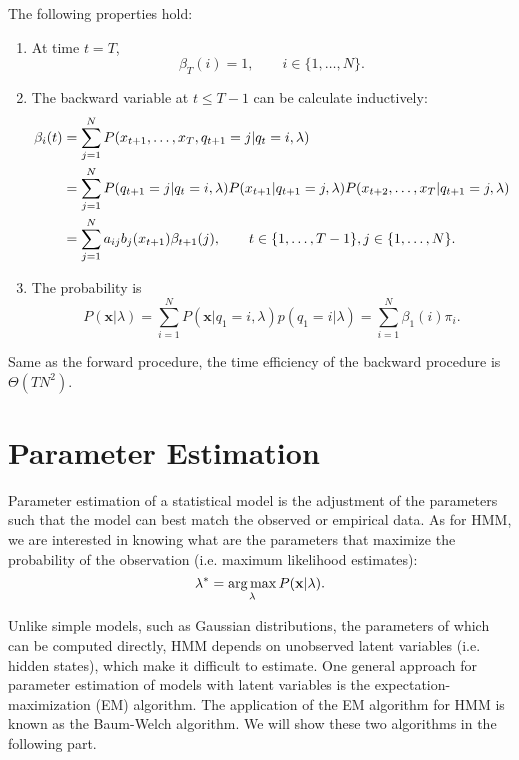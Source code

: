 \documentclass[12pt,final,twoside]{report}
\begin{document}
The following properties hold:
\begin{enumerate}
  \item At time $t = T$,
    \begin{equation}
      \beta_T(i) = 1, \qquad i \in \{1,\dots,N\} .
    \end{equation}
  \item The backward variable at $t \leq T - 1$ can be calculate inductively:
    \begin{align}
      \beta_i(t) &= \sum_{j=1}^{N} P(x_{t+1},\dots,x_T,q_{t+1}=j|q_t=i,\lambda) \notag\\
      &= \sum_{j=1}^{N} P(q_{t+1}=j|q_t=i,\lambda) P(x_{t+1}|q_{t+1}=j,\lambda) P(x_{t+2},\dots,x_T|q_{t+1}=j,\lambda) \notag\\
      &= \sum_{j=1}^{N} a_{ij} b_j(x_{t+1}) \beta_{t+1}(j) , \qquad t \in \{1,\dots,T - 1\}, j \in \{1,\dots,N\} .
    \end{align}
  \item The probability is
    \begin{equation}
      P(\mathbf{x}|\lambda) = \sum_{i=1}^N P(\mathbf{x}|q_1=i,\lambda) p(q_1=i|\lambda) = \sum_{i=1}^N \beta_1(i) \pi_i .
    \end{equation}
\end{enumerate}

Same as the forward procedure, the time efficiency of the backward procedure is $\Theta(TN^2)$.

\section{Parameter Estimation}
Parameter estimation of a statistical model is the adjustment of the parameters such that the model can best match the observed or empirical data. As for HMM, we are interested in knowing what are the parameters that maximize the probability of the observation (i.e. maximum likelihood estimates):
\begin{equation}
  \lambda^* = \operatorname*{arg\,max}_{\lambda} P(\mathbf{x}|\lambda) .
\end{equation}

Unlike simple models, such as Gaussian distributions, the parameters of which can be computed directly, HMM depends on unobserved latent variables (i.e. hidden states), which make it difficult to estimate. One general approach for parameter estimation of models with latent variables is the expectation-maximization (EM) algorithm. The application of the EM algorithm for HMM is known as the Baum-Welch algorithm. We will show these two algorithms in the following part.
\end{document}
